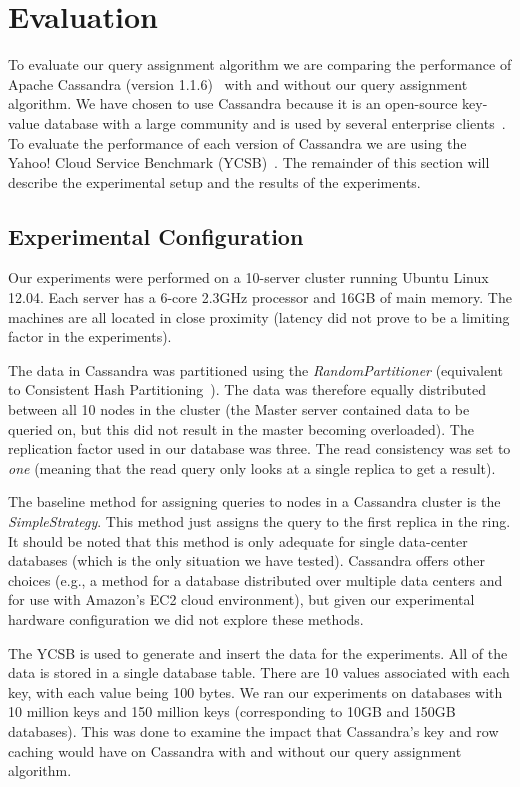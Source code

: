 \section{Evaluation}
\label{sec:experiments}
To evaluate our query assignment algorithm we are comparing the performance of Apache Cassandra (version 1.1.6)~\cite{Lakshman:2010:CDS:1773912.1773922} with and without our query assignment algorithm. We have chosen to use Cassandra because it is an open-source key-value database with a large community and is used by several enterprise clients~\cite{DataStaxCassandra}. To evaluate the performance of each version of Cassandra we are using the Yahoo! Cloud Service Benchmark (YCSB)~\cite{Cooper:2010:BCS:1807128.1807152}. The remainder of this section will describe the experimental setup and the results of the experiments.

\subsection{Experimental Configuration}
Our experiments were performed on a 10-server cluster running Ubuntu Linux 12.04. Each server has a 6-core 2.3GHz processor and 16GB of main memory. The machines are all located in close proximity (latency did not prove to be a limiting factor in the experiments).

The data in Cassandra was partitioned using the \textit{RandomPartitioner} (equivalent to Consistent Hash Partitioning~\cite{consistentHashPartitioning}). The data was therefore equally distributed between all 10 nodes in the cluster (the Master server contained data to be queried on, but this did not result in the master becoming overloaded). The replication factor used in our database was three. The read consistency was set to \textit{one} (meaning that the read query only looks at a single replica to get a result).

The baseline method for assigning queries to nodes in a Cassandra cluster is the \textit{SimpleStrategy}. This method just assigns the query to the first replica in the ring. It should be noted that this method is only adequate for single data-center databases (which is the only situation we have tested). Cassandra offers other choices (e.g., a method for a database distributed over multiple data centers and for use with Amazon's EC2 cloud environment), but given our experimental hardware configuration we did not explore these methods.

The YCSB is used to generate and insert the data for the experiments. All of the data is stored in a single database table. There are 10 values associated with each key, with each value being 100 bytes. We ran our experiments on databases with 10 million keys and 150 million keys (corresponding to 10GB and 150GB databases). This was done to examine the impact that Cassandra's key and row caching would have on Cassandra with and without our query assignment algorithm.

